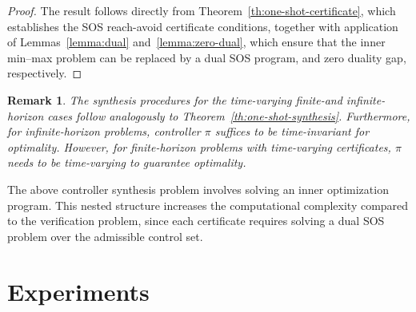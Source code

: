 \documentclass[journal,twoside,web]{ieeecolor}
\newcommand{\ml}[1]{{\color{blue}[ML: #1]}}
\theoremstyle{definition}
\theoremstyle{plain}
\theoremstyle{plain}
\newtheorem{remark}{Remark}
\begin{document}
\begin{proof}
The result follows directly from Theorem~\ref{th:one-shot-certificate}, which establishes the SOS reach-avoid certificate conditions, together with application of Lemmas~\ref{lemma:dual} and~\ref{lemma:zero-dual}, which ensure that the inner min--max problem can be replaced by a dual SOS program, and zero duality gap, respectively. 
\end{proof}



\begin{remark}
    The synthesis procedures for the time-varying finite-and infinite-horizon cases follow analogously to Theorem~\ref{th:one-shot-synthesis}.
    Furthermore, for infinite-horizon problems, controller $\pi$ suffices to be time-invariant for optimality.  However, for finite-horizon problems with time-varying certificates, $\pi$ needs to be time-varying to guarantee optimality.
\end{remark}




The above controller synthesis problem involves solving an inner optimization program. This nested structure increases the computational complexity compared to the verification problem, since each certificate requires solving a dual SOS problem over the admissible control set.




\section{Experiments}
\label{sec:experiments}
\end{document}
